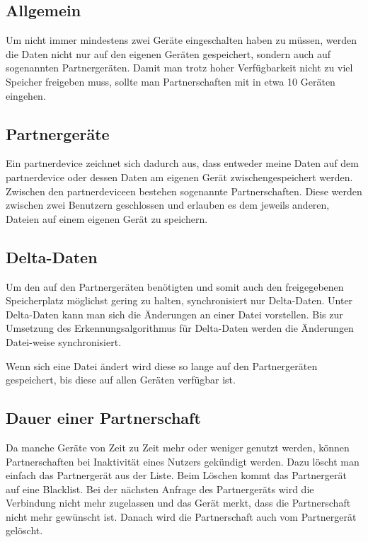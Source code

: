 \subsection{Allgemein}
Um nicht immer mindestens zwei Geräte eingeschalten haben zu müssen, werden die Daten nicht nur auf den eigenen Geräten gespeichert, sondern auch auf sogenannten Partnergeräten. Damit man trotz hoher Verfügbarkeit nicht zu viel Speicher freigeben muss, sollte man Partnerschaften mit in etwa 10 Geräten eingehen. 

\subsection{Partnergeräte} \label{Partnergerät}
Ein \gls{partnerdevice} zeichnet sich dadurch aus, dass entweder meine Daten auf dem \gls{partnerdevice} oder dessen Daten am eigenen Gerät zwischengespeichert werden. Zwischen den \gls{partnerdevice}en bestehen sogenannte Partnerschaften. Diese werden zwischen zwei Benutzern geschlossen und erlauben es dem jeweils anderen, Dateien auf einem eigenen Gerät zu speichern.

\subsection{Delta-Daten}
Um den auf den Partnergeräten benötigten und somit auch den freigegebenen Speicherplatz möglichst gering zu halten, synchronisiert \sblit nur Delta-Daten. Unter Delta-Daten kann man sich die Änderungen an einer Datei vorstellen. Bis zur Umsetzung des Erkennungsalgorithmus für Delta-Daten werden die Änderungen Datei-weise synchronisiert.

Wenn sich eine Datei ändert wird diese so lange auf den Partnergeräten gespeichert, bis diese auf allen Geräten verfügbar ist.

\subsection{Dauer einer Partnerschaft}
Da manche Geräte von Zeit zu Zeit mehr oder weniger genutzt werden, können Partnerschaften bei Inaktivität eines Nutzers gekündigt werden. Dazu löscht man einfach das Partnergerät aus der Liste. Beim Löschen kommt das Partnergerät auf eine Blacklist. Bei der nächsten Anfrage des Partnergeräts wird die Verbindung nicht mehr zugelassen und das Gerät merkt, dass die Partnerschaft nicht mehr gewünscht ist. Danach wird die Partnerschaft auch vom Partnergerät gelöscht.

